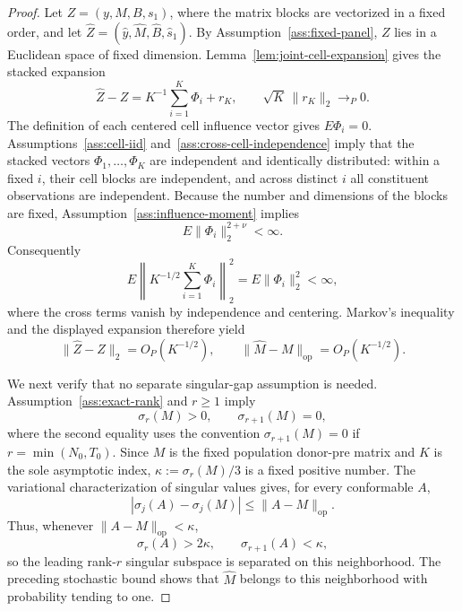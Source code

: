 \documentclass{article}
\begin{document}
\begin{proof}
Let \(Z=(y,M,B,s_1)\), where the matrix blocks are vectorized in a fixed order, and let \(\widehat Z=(\widehat y,\widehat M,\widehat B,\widehat s_1)\). By Assumption~\ref{ass:fixed-panel}, \(Z\) lies in a Euclidean space of fixed dimension. Lemma~\ref{lem:joint-cell-expansion} gives the stacked expansion
\[
 \widehat Z-Z=K^{-1}\sum_{i=1}^K\Phi_i+r_K,
 \qquad \sqrt K\,\|r_K\|_2\to_P0.
\]
The definition of each centered cell influence vector gives \(E\Phi_i=0\). Assumptions~\ref{ass:cell-iid} and~\ref{ass:cross-cell-independence} imply that the stacked vectors \(\Phi_1,\ldots,\Phi_K\) are independent and identically distributed: within a fixed \(i\), their cell blocks are independent, and across distinct \(i\) all constituent observations are independent. Because the number and dimensions of the blocks are fixed, Assumption~\ref{ass:influence-moment} implies
\[
 E\|\Phi_i\|_2^{2+\nu}<\infty.
\]
Consequently
\[
 E\left\|K^{-1/2}\sum_{i=1}^K\Phi_i\right\|_2^2
 =E\|\Phi_i\|_2^2<\infty,
\]
where the cross terms vanish by independence and centering. Markov's inequality and the displayed expansion therefore yield
\[
 \|\widehat Z-Z\|_2=O_P(K^{-1/2}),
 \qquad
 \|\widehat M-M\|_{\mathrm{op}}=O_P(K^{-1/2}).
\]

We next verify that no separate singular-gap assumption is needed. Assumption~\ref{ass:exact-rank} and \(r\ge1\) imply
\[
 \sigma_r(M)>0,
 \qquad
 \sigma_{r+1}(M)=0,
\]
where the second equality uses the convention \(\sigma_{r+1}(M)=0\) if \(r=\min(N_0,T_0)\). Since \(M\) is the fixed population donor-pre matrix and \(K\) is the sole asymptotic index, \(\kappa:=\sigma_r(M)/3\) is a fixed positive number. The variational characterization of singular values gives, for every conformable \(A\),
\[
 |\sigma_j(A)-\sigma_j(M)|\le \|A-M\|_{\mathrm{op}}.
\]
Thus, whenever \(\|A-M\|_{\mathrm{op}}<\kappa\),
\[
 \sigma_r(A)>2\kappa,
 \qquad
 \sigma_{r+1}(A)<\kappa,
\]
so the leading rank-\(r\) singular subspace is separated on this neighborhood. The preceding stochastic bound shows that \(\widehat M\) belongs to this neighborhood with probability tending to one.


\end{proof}
\end{document}
